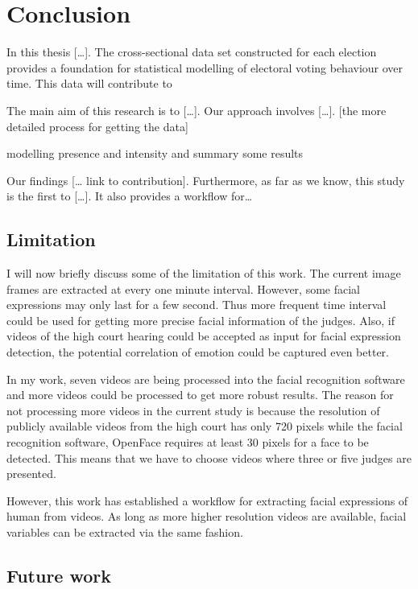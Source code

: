 \documentclass{monashthesis}
\begin{document}
\hypertarget{conclusion}{%
\chapter{Conclusion}\label{conclusion}}

In this thesis {[}\ldots{}{]}. The cross-sectional data set constructed for each election provides a foundation for statistical modelling of electoral voting behaviour over time. This data will contribute to

The main aim of this research is to {[}\ldots{}{]}. Our approach involves {[}\ldots{}{]}. {[}the more detailed process for getting the data{]}

modelling presence and intensity and summary some results

Our findings {[}\ldots{} link to contribution{]}. Furthermore, as far as we know, this study is the first to {[}\ldots{}{]}. It also provides a workflow for\ldots{}

\hypertarget{limitation}{%
\section{Limitation}\label{limitation}}

I will now briefly discuss some of the limitation of this work. The current image frames are extracted at every one minute interval. However, some facial expressions may only last for a few second. Thus more frequent time interval could be used for getting more precise facial information of the judges. Also, if videos of the high court hearing could be accepted as input for facial expression detection, the potential correlation of emotion could be captured even better.

In my work, seven videos are being processed into the facial recognition software and more videos could be processed to get more robust results. The reason for not processing more videos in the current study is because the resolution of publicly available videos from the high court has only 720 pixels while the facial recognition software, OpenFace requires at least 30 pixels for a face to be detected. This means that we have to choose videos where three or five judges are presented.

However, this work has established a workflow for extracting facial expressions of human from videos. As long as more higher resolution videos are available, facial variables can be extracted via the same fashion.

\hypertarget{future-work}{%
\section{Future work}\label{future-work}}
\end{document}
